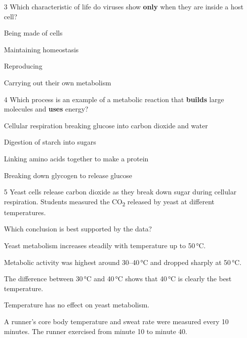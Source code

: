 \documentclass[11pt,letterpaper]{article}
\begin{document}
\begin{mcq}{3}
Which characteristic of life do viruses show \textbf{only} when they are inside a host cell?
\begin{choices}
  \item Being made of cells
  \item Maintaining homeostasis
  \item Reproducing
  \item Carrying out their own metabolism
\end{choices}
\end{mcq}


\begin{mcq}{4}
Which process is an example of a metabolic reaction that \textbf{builds} large molecules and \textbf{uses} energy?
\begin{choices}
  \item Cellular respiration breaking glucose into carbon dioxide and water
  \item Digestion of starch into sugars
  \item Linking amino acids together to make a protein
  \item Breaking down glycogen to release glucose
\end{choices}
\end{mcq}

\begin{mcq}{5}
Yeast cells release carbon dioxide as they break down sugar during cellular respiration. Students measured the CO\textsubscript{2} released by yeast at different temperatures.

Which conclusion is best supported by the data?
\begin{choices}
  \item Yeast metabolism increases steadily with temperature up to 50\,°C.
  \item Metabolic activity was highest around 30–40\,°C and dropped sharply at 50\,°C.
  \item The difference between 30\,°C and 40\,°C shows that 40\,°C is clearly the best temperature.
  \item Temperature has no effect on yeast metabolism.
\end{choices}
\end{mcq}


A runner's core body temperature and sweat rate were measured every 10 minutes. The runner exercised from minute 10 to minute 40.
\end{document}
